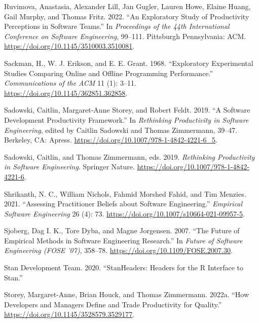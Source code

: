 \documentclass[
]{article}
\newlength{\cslhangindent}
\newenvironment{CSLReferences}[2] %
 {\begin{list}{}{%
  \setlength{\itemindent}{0pt}
  \setlength{\leftmargin}{0pt}
  \setlength{\parsep}{0pt}
  \ifodd #1
   \setlength{\leftmargin}{\cslhangindent}
   \setlength{\itemindent}{-1\cslhangindent}
  \fi
  \setlength{\itemsep}{#2\baselineskip}}}
 {\end{list}}
\begin{document}
\begin{CSLReferences}{1}{0}
Ruvimova, Anastasia, Alexander Lill, Jan Gugler, Lauren Howe, Elaine
Huang, Gail Murphy, and Thomas Fritz. 2022. {``An Exploratory Study of
Productivity Perceptions in Software Teams.''} In \emph{Proceedings of
the 44th {International Conference} on {Software Engineering}}, 99--111.
Pittsburgh Pennsylvania: ACM.
\url{https://doi.org/10.1145/3510003.3510081}.

Sackman, H., W. J. Erikson, and E. E. Grant. 1968. {``Exploratory
Experimental Studies Comparing Online and Offline Programming
Performance.''} \emph{Communications of the ACM} 11 (1): 3--11.
\url{https://doi.org/10.1145/362851.362858}.

Sadowski, Caitlin, Margaret-Anne Storey, and Robert Feldt. 2019. {``A
{Software Development Productivity Framework}.''} In \emph{Rethinking
{Productivity} in {Software Engineering}}, edited by Caitlin Sadowski
and Thomas Zimmermann, 39--47. Berkeley, CA: Apress.
\url{https://doi.org/10.1007/978-1-4842-4221-6_5}.

Sadowski, Caitlin, and Thomas Zimmermann, eds. 2019. \emph{Rethinking
{Productivity} in {Software Engineering}}. Springer Nature.
\url{https://doi.org/10.1007/978-1-4842-4221-6}.

Shrikanth, N. C., William Nichols, Fahmid Morshed Fahid, and Tim
Menzies. 2021. {``Assessing Practitioner Beliefs about Software
Engineering.''} \emph{Empirical Software Engineering} 26 (4): 73.
\url{https://doi.org/10.1007/s10664-021-09957-5}.

Sjoberg, Dag I. K., Tore Dyba, and Magne Jorgensen. 2007. {``The
{Future} of {Empirical Methods} in {Software Engineering Research}.''}
In \emph{Future of {Software Engineering} ({FOSE} '07)}, 358--78.
\url{https://doi.org/10.1109/FOSE.2007.30}.

Stan Development Team. 2020. {``{StanHeaders}: {Headers} for the {R}
Interface to {Stan}.''}

Storey, Margaret-Anne, Brian Houck, and Thomas Zimmermann. 2022a. {``How
{Developers} and {Managers Define} and {Trade Productivity} for
{Quality}.''} \url{https://doi.org/10.1145/3528579.3529177}.


\end{CSLReferences}
\end{document}
